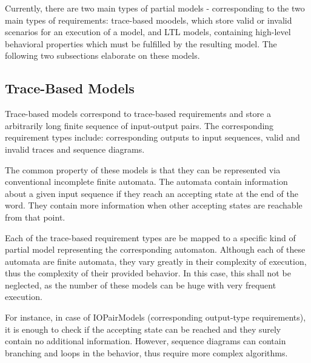 Currently, there are two main types of partial models - corresponding to the two main types of requirements: trace-based moodels, which store valid or invalid scenarios for an execution of a model, and LTL models, containing high-level behavioral properties which must be fulfilled by the resulting model. The following two subsections elaborate on these models. 

\subsection{Trace-Based Models} \label{subs_traceintheframework}

Trace-based models correspond to trace-based requirements and store a arbitrarily long finite sequence of input-output pairs. The corresponding requirement types include: corresponding outputs to input sequences, valid and invalid traces and sequence diagrams. 

The common property of these models is that they can be represented via conventional incomplete finite automata. The automata contain information about a given input sequence if they reach an accepting state at the end of the word. They contain more information when other accepting states are reachable from that point.

Each of the trace-based requirement types are be mapped to a specific kind of partial model representing the corresponding automaton. Although each of these automata are finite automata, they vary greatly in their complexity of execution, thus the complexity of their provided behavior. In this case, this shall not be neglected, as the number of these models can be huge with very frequent execution.

For instance, in case of IOPairModels (corresponding output-type requirements), it is enough to check if the accepting state can be reached and they surely contain no additional information. However, sequence diagrams can contain branching and loops in the behavior, thus require more complex algorithms.

